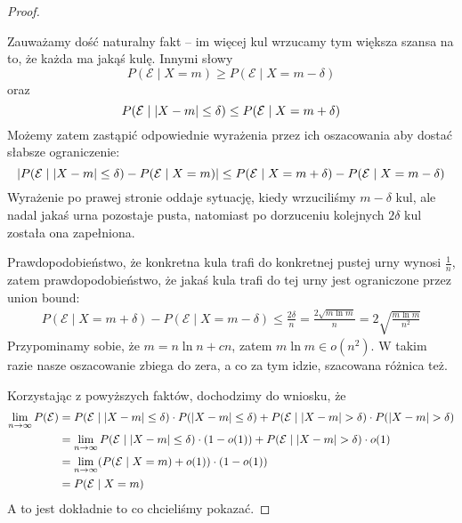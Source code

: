\begin{proof}
\begin{enumerate}
		      Zauważamy dość naturalny fakt -- im więcej kul wrzucamy tym większa szansa na to, że każda ma jakąś kulę. Innymi słowy
		      \[
			      P(\mathcal{E} \mid X = m) \geq P(\mathcal{E} \mid X = m - \delta)
		      \]
		      oraz
		      \[
			      P(\mathcal{E} \mid \left\lvert X - m\right\rvert \leq \delta) \leq  P(\mathcal{E} \mid X = m + \delta)
		      \]
		      Możemy zatem zastąpić odpowiednie wyrażenia przez ich oszacowania aby dostać słabsze ograniczenie:
		      \[
			      \left\lvert P(\mathcal{E} \mid \left\lvert X - m\right\rvert \leq \delta) - P(\mathcal{E} \mid X = m)\right\rvert
			      \leq P(\mathcal{E} \mid X = m + \delta) - P(\mathcal{E} \mid X = m - \delta)
		      \]
		      Wyrażenie po prawej stronie oddaje sytuację, kiedy wrzuciliśmy \( m - \delta \) kul, ale nadal jakaś urna pozostaje pusta, natomiast po dorzuceniu kolejnych \( 2 \delta \) kul została ona zapełniona.

		      Prawdopodobieństwo, że konkretna kula trafi do konkretnej pustej urny wynosi \( \frac{1}{n} \),
		      zatem prawdopodobieństwo, że jakaś kula trafi do tej urny jest ograniczone przez union bound:
		      \begin{align*}
			      P(\mathcal{E} \mid X = m + \delta) - P(\mathcal{E} \mid X = m - \delta)
			      \leq \frac{2\delta}{n}
			      = \frac{2\sqrt{m \ln m}}{n} = 2\sqrt{\frac{m \ln m}{n^2}}
		      \end{align*}
		      Przypominamy sobie, że \( m = n \ln n + cn \), zatem \( m \ln m \in o(n^2) \).
		      W takim razie nasze oszacowanie zbiega do zera, a co za tym idzie, szacowana różnica też.
	\end{enumerate}
	Korzystając z powyższych faktów, dochodzimy do wniosku, że
	\begin{align*}
		\lim_{n \rightarrow \infty} P(\mathcal{E})
		 & = P(\mathcal{E} \mid \abs{X - m} \leq \delta) \cdot P(\abs{X - m} \leq \delta)
		+
		P(\mathcal{E} \mid \abs{X - m} > \delta) \cdot P(\abs{X - m} > \delta)                        \\
		 & = \lim_{n \rightarrow \infty} P(\mathcal{E} \mid \abs{X - m} \leq \delta) \cdot (1 - o(1))
		+
		P(\mathcal{E} \mid \abs{X - m} > \delta) \cdot o(1)                                           \\
		 & = \lim_{n \rightarrow \infty} \pars{P(\mathcal{E} \mid X = m) + o(1)} \cdot (1 - o(1))     \\
		 & = P(\mathcal{E} \mid X = m)                                                                \\
	\end{align*}
	A to jest dokładnie to co chcieliśmy pokazać.
\end{proof}